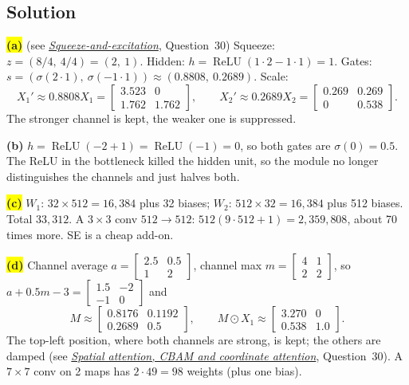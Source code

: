 \documentclass[12pt,a4paper]{article}
\newcommand{\seeconcept}[3]{(see \hyperref[#1]{\textit{#2}}, Question~#3)}
\newcommand{\relu}{\operatorname{ReLU}}
\newcommand{\hlq}[1]{{\setlength{\fboxsep}{1.5pt}\colorbox{yellow}{#1}}}
\begin{document}
\subsection*{Solution}
\hlq{\textbf{(a)}} \seeconcept{c:se}{Squeeze-and-excitation}{30} Squeeze: $z=(8/4,\ 4/4)=(2,\ 1)$. Hidden: $h=\relu(1\cdot2-1\cdot1)=1$. Gates: $s=(\sigma(2\cdot1),\ \sigma(-1\cdot1))\approx(0.8808,\ 0.2689)$. Scale:
\[
X_1'\approx0.8808X_1=\begin{bmatrix}3.523&0\\1.762&1.762\end{bmatrix},\qquad X_2'\approx0.2689X_2=\begin{bmatrix}0.269&0.269\\0&0.538\end{bmatrix}.
\]
The stronger channel is kept, the weaker one is suppressed.

\textbf{(b)} $h=\relu(-2+1)=\relu(-1)=0$, so both gates are $\sigma(0)=0.5$. The ReLU in the bottleneck killed the hidden unit, so the module no longer distinguishes the channels and just halves both.

\hlq{\textbf{(c)}} $W_1$: $32\times512=16{,}384$ plus 32 biases; $W_2$: $512\times32=16{,}384$ plus 512 biases. Total $33{,}312$. A $3\times3$ conv $512\to512$: $512(9\cdot512+1)=2{,}359{,}808$, about 70 times more. SE is a cheap add-on.

\hlq{\textbf{(d)}} Channel average $a=\begin{bmatrix}2.5&0.5\\1&2\end{bmatrix}$, channel max $m=\begin{bmatrix}4&1\\2&2\end{bmatrix}$, so $a+0.5m-3=\begin{bmatrix}1.5&-2\\-1&0\end{bmatrix}$ and
\[
M\approx\begin{bmatrix}0.8176&0.1192\\0.2689&0.5\end{bmatrix},\qquad M\odot X_1\approx\begin{bmatrix}3.270&0\\0.538&1.0\end{bmatrix}.
\]
The top-left position, where both channels are strong, is kept; the others are damped \seeconcept{c:cbam}{Spatial attention, CBAM and coordinate attention}{30}. A $7\times7$ conv on 2 maps has $2\cdot49=98$ weights (plus one bias).
\end{document}
